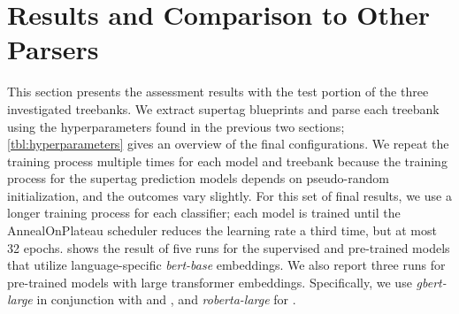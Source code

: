 \documentclass[../../document.tex]{subfiles}
\begin{document}
    \section{Results and Comparison to Other Parsers}\label{sec:results}
    This section presents the assessment results with the test portion of the three investigated treebanks.
    We extract supertag blueprints and parse each treebank using the hyperparameters found in the previous two sections; \cref{tbl:hyperparameters} gives an overview of the final configurations.
    We repeat the training process multiple times for each model and treebank because the training process for the supertag prediction models depends on pseudo-random initialization, and the outcomes vary slightly.
    For this set of final results, we use a longer training process for each classifier; each model is trained until the AnnealOnPlateau scheduler reduces the learning rate a third time, but at most 32 epochs.
     shows the result of five runs for the supervised and pre-trained models that utilize language-specific \emph{bert-base} embeddings.
    We also report three runs for pre-trained models with large transformer embeddings.
    Specifically, we use \emph{gbert-large} \citep{Cha20} in conjunction with \negra{} and \tiger{}, and \emph{roberta-large} \citep{roberta} for \dptb{}.
\end{document}
